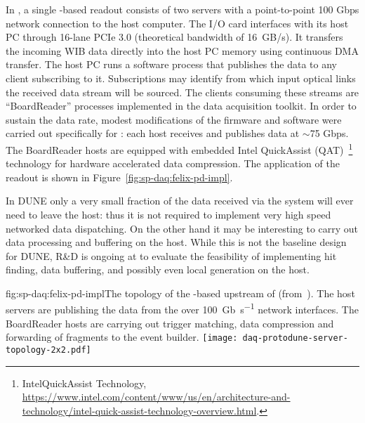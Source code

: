 In , a single  -based readout consists of two servers with a point-to-point 100 Gbps network connection to the  host computer.
The  I/O card interfaces with its host PC through 16-lane PCIe 3.0 (theoretical bandwidth of \SI{16}{GB/s}).
It transfers the incoming WIB data directly into the host PC memory using continuous DMA transfer. The  host PC runs a software process that publishes the data to any client subscribing to it.
Subscriptions may identify from which input optical links the received data stream will be sourced.
The clients consuming these streams are ``BoardReader'' processes implemented in the  data acquisition toolkit.
In order to sustain the data rate, modest modifications of the firmware and software were carried out specifically for : each  host receives and publishes data at $\sim$75 Gbps. The BoardReader hosts are equipped with embedded Intel QuickAssist (QAT)~\footnote{Intel\textregistered QuickAssist Technology, \url{https://www.intel.com/content/www/us/en/architecture-and-technology/intel-quick-assist-technology-overview.html}.} technology for hardware accelerated data compression. The  application of the   readout is shown in Figure~\ref{fig:sp-daq:felix-pd-impl}.


In DUNE only a very small fraction of the data received via the 
system will ever need to leave the host: thus it is not required to
implement very high speed networked data dispatching. On the other
hand it may be interesting to carry out data processing and buffering
on the host. While this is not the baseline design for DUNE, R\&D is
ongoing at  to evaluate the feasibility of
implementing hit finding, data buffering, and possibly even local
 generation on the  host. 


\begin{dunefigure}{fig:sp-daq:felix-pd-impl}{The topology of the -based
    upstream  of  (from~\cite{pdsp-felix}). The  host servers are publishing the data from the  over \SI{100}{Gb\per\second} network interfaces. The BoardReader hosts are carrying out trigger matching, data compression and forwarding of fragments to the event builder.}
  \texttt{[image: daq-protodune-server-topology-2x2.pdf]}
\end{dunefigure}


